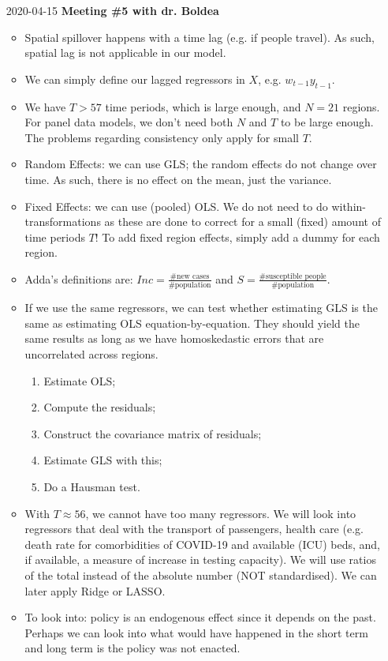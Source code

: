 \documentclass{article}
\begin{document}
\begin{itemize}
	\item[2020-04-15]
	\textbf{Meeting \#5 with dr. Boldea}
	\begin{itemize}
		\item Spatial spillover happens with a time lag (e.g. if people travel). As such, spatial lag is not applicable in our model.
		\item We can simply define our lagged regressors in $X$, e.g. $w_{t-1}y_{t-1}$.
		\item We have $T>57$ time periods, which is large enough, and $N=21$ regions. For panel data models, we don't need both $N$ and $T$ to be large enough. The problems regarding consistency only apply for small $T$.
		\item Random Effects: we can use GLS; the random effects do not change over time. As such, there is no effect on the mean, just the variance.
		\item Fixed Effects: we can use (pooled) OLS. We do not need to do within-transformations as these are done to correct for a small (fixed) amount of time periods $T$! To add fixed region effects, simply add a dummy for each region.
		\item Adda's definitions are: $Inc = \frac{\text{\#new cases}}{\text{\#population}}$ and $S = \frac{\text{\#susceptible people}}{\text{\#population}}$.
		\item If we use the same regressors, we can test whether estimating GLS is the same as estimating OLS equation-by-equation. They should yield the same results as long as we have homoskedastic errors that are uncorrelated across regions.
			\begin{enumerate}
				\item Estimate OLS;
				\item Compute the residuals;
				\item Construct the covariance matrix of residuals;
				\item Estimate GLS with this;
				\item Do a Hausman test.
			\end{enumerate}
		\item With $T \approx 56$, we cannot have too many regressors. We will look into regressors that deal with the transport of passengers, health care (e.g. death rate for comorbidities of COVID-19 and available (ICU) beds, and, if available, a measure of increase in testing capacity). We will use ratios of the total instead of the absolute number (NOT standardised). We can later apply Ridge or LASSO.
		\item To look into: policy is an endogenous effect since it depends on the past. Perhaps we can look into what would have happened in the short term and long term is the policy was not enacted.
	\end{itemize}
	

\end{itemize}
\end{document}
